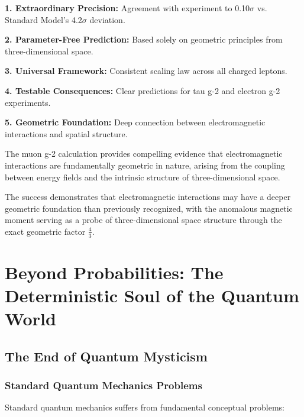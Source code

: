 \documentclass[12pt,a4paper]{report}
\begin{document}
\textbf{1. Extraordinary Precision:}
Agreement with experiment to 0.10$\sigma$ vs. Standard Model's 4.2$\sigma$ deviation.

\textbf{2. Parameter-Free Prediction:}
Based solely on geometric principles from three-dimensional space.

\textbf{3. Universal Framework:}
Consistent scaling law across all charged leptons.

\textbf{4. Testable Consequences:}
Clear predictions for tau g-2 and electron g-2 experiments.

\textbf{5. Geometric Foundation:}
Deep connection between electromagnetic interactions and spatial structure.

\begin{tcolorbox}[colback=green!5!white,colframe=green!75!black,title=Fundamental Conclusion]
	The muon g-2 calculation provides compelling evidence that electromagnetic interactions are fundamentally geometric in nature, arising from the coupling between energy fields and the intrinsic structure of three-dimensional space.
\end{tcolorbox}

The success demonstrates that electromagnetic interactions may have a deeper geometric foundation than previously recognized, with the anomalous magnetic moment serving as a probe of three-dimensional space structure through the exact geometric factor $\frac{4}{3}$.

	\chapter{Beyond Probabilities: The Deterministic Soul of the Quantum World}
	\label{chap:deterministic_qm}
	
	\section{The End of Quantum Mysticism}
	\label{sec:end_quantum_mysticism}
	
	\subsection{Standard Quantum Mechanics Problems}
	\label{subsec:standard_qm_problems}
	
	Standard quantum mechanics suffers from fundamental conceptual problems:
	
\end{document}
